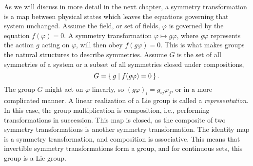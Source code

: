 As we will discuss in more detail in the next chapter, a symmetry transformation is a map between physical states which leaves the equations governing that system unchanged.
Assume the field, or set of fields, $\varphi$ is governed by the equation $f(\varphi) = 0$.
A symmetry transformation $\varphi \mapsto g \varphi$, where $g\varphi$ represents the action $g$ acting on $\varphi$, will then obey $f(g\varphi) = 0$.
This is what makes groups the natural structures to describe symmetries.
Assume $G$ is the set of all symmetries of a system or a subset of all symmetries closed under compositions, 
%
\begin{equation}
    G = \left\{\, g \mid f(g\varphi) = 0 \,\right\}.
\end{equation}
%
The group $G$ might act on $\varphi$ linearly, so $(g\varphi)_i = g_{ij}\varphi_j$, or in a more complicated manner.
A linear realization of a Lie group is called a \emph{representation}.
In this case, the group multiplication is composition, i.e., performing transformations in succession.
This map is closed, as the composite of two symmetry transformations is another symmetry transformation.
The identity map is a symmetry transformation, and composition is associative.
This means that invertible symmetry transformations form a group, and for continuous sets, this group is a Lie group.

